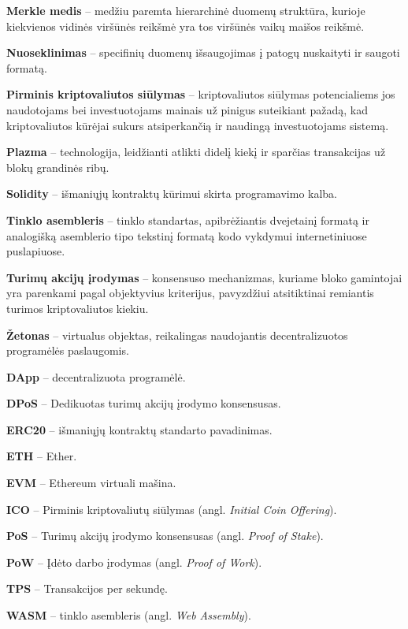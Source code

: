 \documentclass{VUMIFPSkursinis}
\begin{document}
\textbf{Merkle medis} – medžiu paremta hierarchinė duomenų struktūra, kurioje kiekvienos vidinės viršūnės reikšmė yra tos viršūnės vaikų maišos reikšmė.

\textbf{Nuoseklinimas} – specifinių duomenų išsaugojimas į patogų nuskaityti ir saugoti formatą.

\textbf{Pirminis kriptovaliutos siūlymas} – kriptovaliutos siūlymas potencialiems jos naudotojams bei investuotojams mainais už pinigus suteikiant pažadą, kad kriptovaliutos kūrėjai sukurs atsiperkančią ir naudingą investuotojams sistemą.

\textbf{Plazma} – technologija, leidžianti atlikti didelį kiekį ir sparčias transakcijas už blokų grandinės ribų.

\textbf{Solidity} – išmaniųjų kontraktų kūrimui skirta programavimo kalba.

\textbf{Tinklo asembleris} – tinklo standartas, apibrėžiantis dvejetainį formatą ir analogišką asemblerio tipo tekstinį formatą kodo vykdymui internetiniuose puslapiuose.

\textbf{Turimų akcijų įrodymas} – konsensuso mechanizmas, kuriame bloko gamintojai yra parenkami pagal objektyvius kriterijus, pavyzdžiui atsitiktinai remiantis turimos kriptovaliutos kiekiu.

\textbf{Žetonas} – virtualus objektas, reikalingas naudojantis decentralizuotos programėlės paslaugomis.

\textbf{DApp} – decentralizuota programėlė.

\textbf{DPoS} – Dedikuotas turimų akcijų įrodymo konsensusas.

\textbf{ERC20} – išmaniųjų kontraktų standarto pavadinimas.

\textbf{ETH} – Ether.

\textbf{EVM} – Ethereum virtuali mašina.

\textbf{ICO} – Pirminis kriptovaliutų siūlymas (angl. \textit{Initial Coin Offering}).

\textbf{PoS} – Turimų akcijų įrodymo konsensusas (angl. \textit{Proof of Stake}).

\textbf{PoW} – Įdėto darbo įrodymas (angl. \textit{Proof of Work}).

\textbf{TPS} – Transakcijos per sekundę.

\textbf{WASM} – tinklo asembleris (angl. \textit{Web Assembly}).





\clearpage
\end{document}
